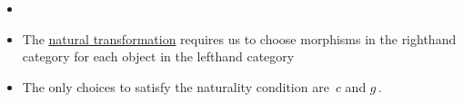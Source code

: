 \begin{itemize}
    \item {}
    \item The \href{doc/1 math/Seven Sketches in Compositionality/Chapter 3: Databases/3 Functors, natural transformations, and databases/4 Natural transformations/1 Natural transformation}{natural transformation} requires us to choose morphisms in the righthand category for each object in the lefthand category
    \item The only choices to satisfy the naturality condition are \,$c$ and $g$\,.
  \end{itemize}
